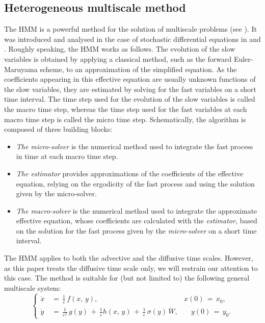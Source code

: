 \subsection{Heterogeneous multiscale method}
\label{sub:Heterogeneous multiscale method}
The HMM is a powerful method for the solution of multiscale problems (see \cite{weinan2003heterognous}).
It was introduced and analysed in the case of stochastic differential equations in \cite{vanden2003fast} and \cite{weinan2005analysis}. 
Roughly speaking, the HMM works as follows.
The evolution of the slow variables is obtained by applying a classical method, such as the forward Euler-Maruyama scheme, to an approximation of the simplified equation.
As the coefficients appearing in this effective equation are usually unknown functions of the slow variables, they are estimated by solving for the fast variables on a short time interval.
The time step used for the evolution of the slow variables is called the macro time step, whereas the time step used for the fast variables at each macro time step is called the micro time step.
Schematically, the algorithm is composed of three building blocks: 
\begin{itemize}
	\item \emph{The micro-solver} is the numerical method used to integrate the fast process in time at each macro time step.  
	\item \emph{The estimator} provides approximations of the coefficients of the effective equation, relying on the ergodicity of the fast process and using the solution given by the micro-solver.
	\item \emph{The macro-solver} is the numerical method used to integrate the approximate effective equation, whose coefficients are calculated with the \emph{estimator}, based on the solution for the fast process given by the \emph{micro-solver} on a short time interval. 
\end{itemize}
The HMM applies to both the advective and the diffusive time scales.
However, as this paper treats the diffusive time scale only, we will restrain our attention to this case.
The method is suitable for (but not limited to) the following general multiscale system:
\begin{equation*}
	\left\{\begin{aligned}
		\dot x &\,=\, \frac{1}{\varepsilon}\, f(x,\,y), \quad \quad & x(0) \,=\, x_0, \\ 
		\dot y &\,=\, \frac{1}{{\varepsilon}^2}\, g(y) \,+\, \frac{1}{\varepsilon} h(x,\,y)\,+\, \frac{1}{\varepsilon}\,{\sigma}(y)\, \dot W, & \quad y(0) \,=\, y_0.
	\end{aligned}\right.
\end{equation*}
